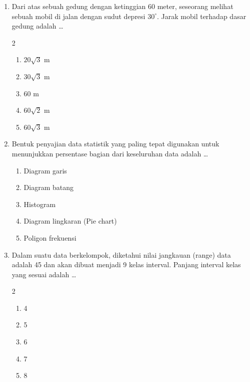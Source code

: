 \documentclass[12pt,a4paper]{article}
\begin{document}
\begin{enumerate}[itemsep=2ex]
    \item Dari atas sebuah gedung dengan ketinggian 60 meter, seseorang melihat sebuah mobil di jalan dengan sudut depresi $30^\circ$. Jarak mobil terhadap dasar gedung adalah \dots
    \begin{multicols}{2}
    \begin{enumerate}[label=\Alph*.]
        \item $20\sqrt{3}$ m
        \item $30\sqrt{3}$ m
        \item $60$ m
        \item $60\sqrt{2}$ m
        \item $60\sqrt{3}$ m
    \end{enumerate}
    \end{multicols}

    \item Bentuk penyajian data statistik yang paling tepat digunakan untuk menunjukkan persentase bagian dari keseluruhan data adalah \dots
    \begin{enumerate}[label=\Alph*.]
        \item Diagram garis
        \item Diagram batang
        \item Histogram
        \item Diagram lingkaran (Pie chart)
        \item Poligon frekuensi
    \end{enumerate}

    \item Dalam suatu data berkelompok, diketahui nilai jangkauan (range) data adalah 45 dan akan dibuat menjadi 9 kelas interval. Panjang interval kelas yang sesuai adalah \dots
    \begin{multicols}{2}
    \begin{enumerate}[label=\Alph*.]
        \item 4
        \item 5
        \item 6
        \item 7
        \item 8
    \end{enumerate}
    \end{multicols}


\end{enumerate}
\end{document}
